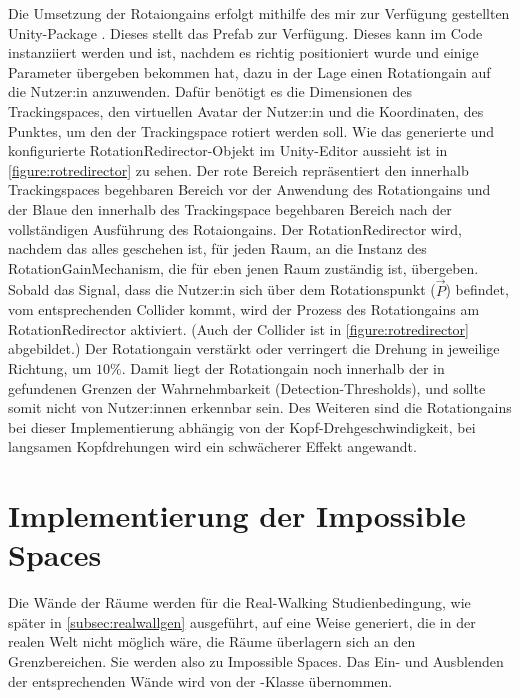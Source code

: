 Die Umsetzung der Rotaiongains erfolgt mithilfe des mir zur Verfügung gestellten Unity-Package . %
Dieses stellt das Prefab  zur Verfügung. Dieses kann im Code instanziiert werden und ist, nachdem es richtig positioniert wurde und einige Parameter übergeben bekommen hat, dazu in der Lage einen Rotationgain auf die Nutzer:in anzuwenden. Dafür benötigt es die Dimensionen des Trackingspaces, den virtuellen Avatar der Nutzer:in und die Koordinaten, des Punktes, um den der Trackingspace rotiert werden soll.
Wie das generierte und konfigurierte RotationRedirector-Objekt im Unity-Editor aussieht ist in \autoref{figure:rotredirector} zu sehen. Der rote Bereich repräsentiert den innerhalb Trackingspaces begehbaren Bereich vor der Anwendung des Rotationgains und der Blaue den innerhalb des Trackingspace begehbaren Bereich nach der vollständigen Ausführung des Rotaiongains.
Der RotationRedirector wird, nachdem das alles geschehen ist, für jeden Raum, an die Instanz des RotationGainMechanism, die für eben jenen Raum zuständig ist, übergeben. Sobald das Signal, dass die Nutzer:in sich über dem Rotationspunkt ($\vec{P}$) befindet, vom entsprechenden Collider kommt, wird der Prozess des Rotationgains am RotationRedirector aktiviert. (Auch der Collider ist in \autoref{figure:rotredirector} abgebildet.)
Der Rotationgain verstärkt oder verringert die Drehung in jeweilige Richtung, um $10\%$. Damit liegt der Rotationgain noch innerhalb der in \cite{detection-thresholds} gefundenen Grenzen der Wahrnehmbarkeit (Detection-Thresholds), und sollte somit nicht von Nutzer:innen erkennbar sein.
Des Weiteren sind die Rotationgains bei dieser Implementierung abhängig von der Kopf-Drehgeschwindigkeit, bei langsamen Kopfdrehungen wird ein schwächerer Effekt angewandt.

\section{Implementierung der Impossible Spaces}
Die Wände der Räume werden für die Real-Walking Studienbedingung, wie später in \autoref{subsec:realwallgen} ausgeführt, auf eine Weise generiert, die in der realen Welt nicht möglich wäre, die Räume überlagern sich an den Grenzbereichen. Sie werden also zu Impossible Spaces. Das Ein- und Ausblenden der entsprechenden Wände wird von der -Klasse übernommen.

